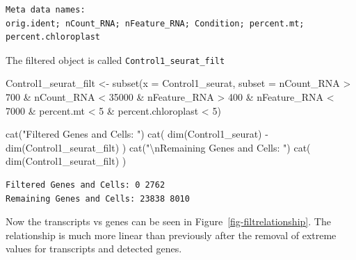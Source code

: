 \documentclass[
  letterpaper,
  DIV=11,
  numbers=noendperiod]{scrartcl}
\newenvironment{Shaded}{}{}
\newcommand{\AttributeTok}[1]{\textcolor[rgb]{0.49,0.56,0.16}{#1}}
\newcommand{\DecValTok}[1]{\textcolor[rgb]{0.25,0.63,0.44}{#1}}
\newcommand{\FunctionTok}[1]{\textcolor[rgb]{0.02,0.16,0.49}{#1}}
\newcommand{\NormalTok}[1]{#1}
\newcommand{\OtherTok}[1]{\textcolor[rgb]{0.00,0.44,0.13}{#1}}
\newcommand{\SpecialCharTok}[1]{\textcolor[rgb]{0.25,0.44,0.63}{#1}}
\newcommand{\StringTok}[1]{\textcolor[rgb]{0.25,0.44,0.63}{#1}}
\begin{document}
\begin{verbatim}
Meta data names:
orig.ident; nCount_RNA; nFeature_RNA; Condition; percent.mt; percent.chloroplast
\end{verbatim}

The filtered object is called \texttt{Control1\_seurat\_filt}

\begin{Shaded}
\begin{Highlighting}[]
\NormalTok{Control1\_seurat\_filt }\OtherTok{\textless{}{-}} \FunctionTok{subset}\NormalTok{(}\AttributeTok{x =}\NormalTok{ Control1\_seurat, }
                                        \AttributeTok{subset =}\NormalTok{ nCount\_RNA }\SpecialCharTok{\textgreater{}} \DecValTok{700} \SpecialCharTok{\&}
\NormalTok{                                                 nCount\_RNA }\SpecialCharTok{\textless{}} \DecValTok{35000} \SpecialCharTok{\&}
\NormalTok{                                                 nFeature\_RNA }\SpecialCharTok{\textgreater{}} \DecValTok{400} \SpecialCharTok{\&} 
\NormalTok{                                                 nFeature\_RNA }\SpecialCharTok{\textless{}} \DecValTok{7000} \SpecialCharTok{\&} 
\NormalTok{                                                 percent.mt }\SpecialCharTok{\textless{}} \DecValTok{5} \SpecialCharTok{\&} 
\NormalTok{                                                 percent.chloroplast }\SpecialCharTok{\textless{}} \DecValTok{5}\NormalTok{)}

\FunctionTok{cat}\NormalTok{(}\StringTok{"Filtered Genes and Cells: "}\NormalTok{)}
\FunctionTok{cat}\NormalTok{( }\FunctionTok{dim}\NormalTok{(Control1\_seurat) }\SpecialCharTok{{-}} \FunctionTok{dim}\NormalTok{(Control1\_seurat\_filt) )}
\FunctionTok{cat}\NormalTok{(}\StringTok{"}\SpecialCharTok{\textbackslash{}n}\StringTok{Remaining Genes and Cells: "}\NormalTok{)}
\FunctionTok{cat}\NormalTok{( }\FunctionTok{dim}\NormalTok{(Control1\_seurat\_filt) )}
\end{Highlighting}
\end{Shaded}

\begin{verbatim}
Filtered Genes and Cells: 0 2762
Remaining Genes and Cells: 23838 8010
\end{verbatim}

Now the transcripts vs genes can be seen in
Figure~\ref{fig-filtrelationship}. The relationship is much more linear
than previously after the removal of extreme values for transcripts and
detected genes.
\end{document}
